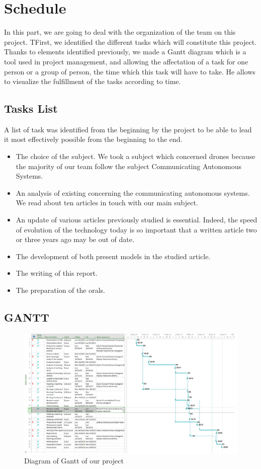 \chapter{Schedule}

In this part, we are going to deal with the organization of the team on this project. TFirst, we identified the different tasks which will constitute this project. Thanks to elements identified previously, we made a Gantt diagram which is a tool used in project management, and allowing the affectation of a task for one person or a group of person, the time which this task will have to take. He allows to visualize the fulfillment of the tasks according to time.

\section{Tasks List}

A list of task was identified from the beginning by the project to be able to lead it most effectively possible from the beginning to the end.

\begin{itemize}
\item The choice of the subject. We took a subject which concerned drones because the majority of our team follow the subject Communicating Autonomous Systems.
\item An analysis of existing concerning the communicating autonomous systems. We read about ten articles in touch with our main subject.
\item An update of various articles previously studied is essential. Indeed, the speed of evolution of the technology today is so important that a written article two or three years ago may be out of date.
\item The development of both present models in the studied article.
\item The writing of this report.
\item The preparation of the orals.\\
\end{itemize}

\section{GANTT}

\begin{figure}[h]
\center
\includegraphics[scale=0.7]{../images/Gantt.png}
\caption{\label{Gantt}Diagram of Gantt of our project}
\end{figure}